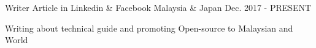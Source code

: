 

\begin{cventries}

  \cventry
    {Writer} %
	{Article in Linkedin \& Facebook} %
	{Malaysia \& Japan} %
    {Dec. 2017 - PRESENT} %
    {
      \begin{cvitems} %
        \item {Writing about technical guide and promoting Open-source to Malaysian and World}
      \end{cvitems}
    }

%
\end{cventries}
